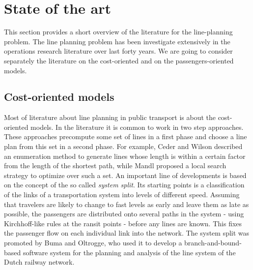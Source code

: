\documentclass[
  twoside,
  11pt, a4paper,
  footinclude=true,
  headinclude=true,
  cleardoublepage=empty
]{scrbook}
\theoremstyle{definition}
\begin{document}
\chapter{State of the art}
This section provides a short overview of the literature  for the line-planning problem. The line planning problem has been investigate extensively in the operations research literature over last forty years. We are going to consider separately the literature on the cost-oriented and on the passengers-oriented models.
\section{Cost-oriented models}
Most of literature about line planning in public transport is about the cost-oriented models. \newline
In the literature it is common to work in two step approaches. These approaches precompute some set of lines in a first phase and choose a line plan from this set in a second phase. For example, Ceder and Wilson described an enumeration method to generate lines whose length is within a certain factor from the length of the shortest path, while Mandl proposed a local search strategy to optimize over such a set. \newline
An important line of developments is based on the concept of the so called \emph{system split}. Its starting points is a classification of the links of a transportation system into levels of different speed. Assuming that travelers are likely to change to fast levels as early and leave them as late as possible, the passengers are distributed onto several paths in the system - using Kirchhoff-like rules at the ransit points - before any lines are known. This fixes the passenger flow on each individual link into the network. The system split was promoted by Buma and Oltrogge, who used it to develop a branch-and-bound-based software system for the planning and analysis of the line system of the Dutch railway network.
\end{document}
